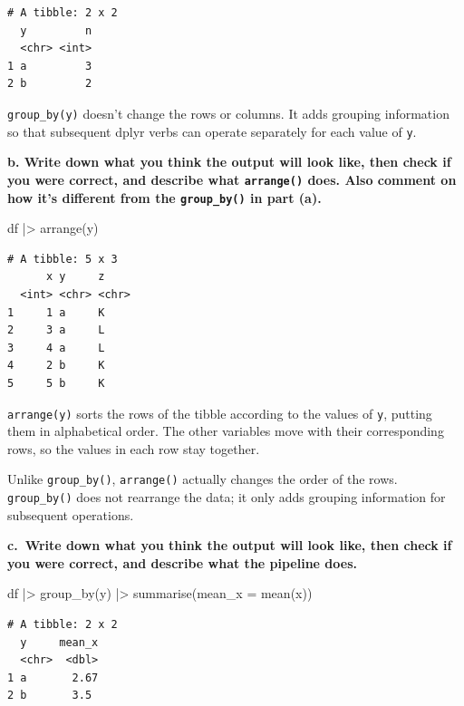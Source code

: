 \documentclass[
  letterpaper,
  DIV=11,
  numbers=noendperiod]{scrreprt}
\newenvironment{Shaded}{\begin{snugshade}}{\end{snugshade}}
\newcommand{\AttributeTok}[1]{\textcolor[rgb]{0.40,0.45,0.13}{#1}}
\newcommand{\FunctionTok}[1]{\textcolor[rgb]{0.28,0.35,0.67}{#1}}
\newcommand{\NormalTok}[1]{\textcolor[rgb]{0.00,0.23,0.31}{#1}}
\newcommand{\SpecialCharTok}[1]{\textcolor[rgb]{0.37,0.37,0.37}{#1}}
\begin{document}
\begin{verbatim}
# A tibble: 2 x 2
  y         n
  <chr> <int>
1 a         3
2 b         2
\end{verbatim}

\texttt{group\_by(y)} doesn't change the rows or columns. It adds
grouping information so that subsequent dplyr verbs can operate
separately for each value of \texttt{y}.

\textbf{b. Write down what you think the output will look like, then
check if you were correct, and describe what \texttt{arrange()} does.
Also comment on how it's different from the \texttt{group\_by()} in part
(a).}

\begin{Shaded}
\begin{Highlighting}[]
\NormalTok{df }\SpecialCharTok{|\textgreater{}}
  \FunctionTok{arrange}\NormalTok{(y)}
\end{Highlighting}
\end{Shaded}

\begin{verbatim}
# A tibble: 5 x 3
      x y     z    
  <int> <chr> <chr>
1     1 a     K    
2     3 a     L    
3     4 a     L    
4     2 b     K    
5     5 b     K    
\end{verbatim}

\texttt{arrange(y)} sorts the rows of the tibble according to the values
of \texttt{y}, putting them in alphabetical order. The other variables
move with their corresponding rows, so the values in each row stay
together.

Unlike \texttt{group\_by()}, \texttt{arrange()} actually changes the
order of the rows. \texttt{group\_by()} does not rearrange the data; it
only adds grouping information for subsequent operations.

\textbf{c.~Write down what you think the output will look like, then
check if you were correct, and describe what the pipeline does.}

\begin{Shaded}
\begin{Highlighting}[]
\NormalTok{df }\SpecialCharTok{|\textgreater{}}
  \FunctionTok{group\_by}\NormalTok{(y) }\SpecialCharTok{|\textgreater{}}
  \FunctionTok{summarise}\NormalTok{(}\AttributeTok{mean\_x =} \FunctionTok{mean}\NormalTok{(x))}
\end{Highlighting}
\end{Shaded}

\begin{verbatim}
# A tibble: 2 x 2
  y     mean_x
  <chr>  <dbl>
1 a       2.67
2 b       3.5 
\end{verbatim}
\end{document}

